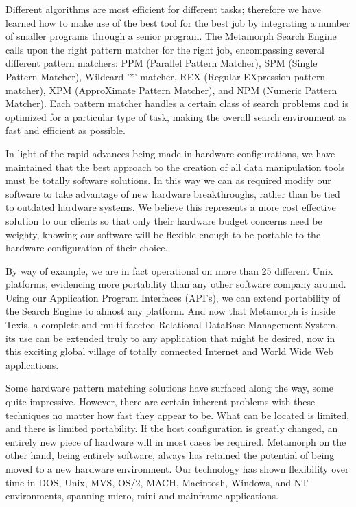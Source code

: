 Different algorithms are most efficient for different tasks; therefore
we have learned how to make use of the best tool for the best job by
integrating a number of smaller programs through a senior program.
The Metamorph Search Engine calls upon the right pattern matcher for
the right job, encompassing several different pattern matchers:  PPM
(Parallel Pattern Matcher), SPM (Single Pattern Matcher), Wildcard '*'
matcher, REX (Regular EXpression pattern matcher), XPM (ApproXimate
Pattern Matcher), and NPM (Numeric Pattern Matcher).  Each pattern
matcher handles a certain class of search problems and is optimized
for a particular type of task, making the overall search environment
as fast and efficient as possible.

In light of the rapid advances being made in hardware configurations,
we have maintained that the best approach to the creation of all data
manipulation tools must be totally software solutions.  In this way we
can as required modify our software to take advantage of new hardware
breakthroughs, rather than be tied to outdated hardware systems.  We
believe this represents a more cost effective solution to our clients
so that only their hardware budget concerns need be weighty, knowing
our software will be flexible enough to be portable to the hardware
configuration of their choice.

By way of example, we are in fact operational on more than 25
different Unix platforms, evidencing more portability than any other
software company around.  Using our Application Program
Interfaces (API's), we can extend portability of the Search Engine to
almost any platform. And now that Metamorph is inside Texis,
a complete and multi-faceted Relational DataBase Management System,
its use can be extended truly to any application that might
be desired, now in this exciting global village of
totally connected Internet and World Wide Web applications.

Some hardware pattern matching solutions have surfaced along the way,
some quite impressive.  However, there are certain inherent problems
with these techniques no matter how fast they appear to be.  What can
be located is limited, and there is limited portability.  If the host
configuration is greatly changed, an entirely new piece of hardware
will in most cases be required.  Metamorph on the other hand, being
entirely software, always has retained the potential of being moved to
a new hardware environment.  Our technology has shown flexibility over
time in DOS, Unix, MVS, OS/2, MACH, Macintosh, Windows, and NT
environments, spanning micro, mini and mainframe applications.


